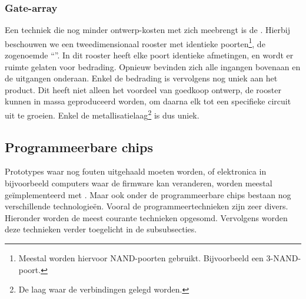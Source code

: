 \subsubsection{Gate-array}
Een techniek die nog minder ontwerp-kosten met zich meebrengt is de . Hierbij beschouwen we een tweedimensionaal rooster met identieke poorten\footnote{Meestal worden hiervoor NAND-poorten gebruikt. Bijvoorbeeld een $3$-NAND-poort.}, de zogenoemde ``''. In dit rooster heeft elke poort identieke afmetingen, en wordt er ruimte gelaten voor bedrading. Opnieuw bevinden zich alle ingangen bovenaan en de uitgangen onderaan. Enkel de bedrading is vervolgens nog uniek aan het product. Dit heeft niet alleen het voordeel van goedkoop ontwerp, de rooster kunnen in massa geproduceerd worden, om daarna elk tot een specifieke circuit uit te groeien. Enkel de metallisatielaag\footnote{De laag waar de verbindingen gelegd worden.} is dus uniek.

\subsection{Programmeerbare chips}
Prototypes waar nog fouten uitgehaald moeten worden, of elektronica in bijvoorbeeld computers waar de firmware kan veranderen, worden meestal ge\"implementeerd met . Maar ook onder de programmeerbare chips bestaan nog verschillende technologie\"en. Vooral de programmeertechnieken zijn zeer divers. Hieronder worden de meest courante technieken opgesomd. Vervolgens worden deze technieken verder toegelicht in de subsubsecties.

